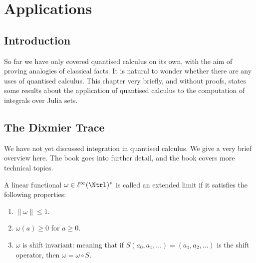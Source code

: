
\chapter{Applications} %

\label{Applications} %



\section{Introduction}
So far we have only covered quantised calculus on its own, 
with the aim of proving analogies of classical facts. It is natural
to wonder whether there are any uses of quantised calculus. This
chapter very briefly, and without proofs, states
some results about the application of quantised calculus to the computation
of integrals over Julia sets.

\section{The Dixmier Trace}
We have not yet discussed integration in quantised calculus. We give
a very brief overview here. The book \cite{Connes94} goes into further
detail, and the book \cite{SingularTraces} covers more technical topics.

\begin{definition}
    A linear functional $\omega \in \ell^\infty(\Ntrl)^*$ is called an extended
    limit if it satisfies the following properties:
    \begin{enumerate}
        \item{} $\|\omega\| \leq 1$.
        \item{} $\omega(a) \geq 0$ for $a \geq 0$.
        \item{} $\omega$ is shift invariant: meaning that if $S(a_0,a_1,\ldots) = (a_1,a_2,\ldots)$
        is the shift operator, then $\omega = \omega\circ S$.
    \end{enumerate}
\end{definition}    

